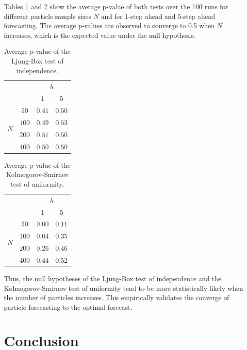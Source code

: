 \documentclass{article}
\begin{document}
Tables \ref{tab:LB} and \ref{tab:KS} show the average p-value of both tests over the 100 runs for different particle sample sizes $N$ and for 1-step ahead and 5-step ahead forecasting. The average p-values are observed to converge to 0.5 when $N$ increases, which is the expected value under the null hypothesis.

\begin{table}[ht]
\centering
\begin{tabular}{ |c|c|c|c| }
 \cline{3-4}
 \multicolumn{2}{c|}{} & \multicolumn{2}{c|}{$h$} \\
 \cline{3-4}
 \multicolumn{2}{c|}{} & $1$ & $5$ \\
 \hline
 \multirow{4}{*}{$N$} & $50$ & $0.41$ & $0.50$ \\ 
 & $100$ & $0.49$ & $0.53$ \\
 & $200$ & $0.51$ & $0.50$ \\ 
 & $400$ & $0.50$ & $0.50$ \\
 \hline
\end{tabular}
\caption{Average p-value of the Ljung-Box test of independence.}
\label{tab:LB}
\end{table}

\begin{table}[ht]
\centering
\begin{tabular}{ |c|c|c|c| }
 \cline{3-4}
 \multicolumn{2}{c|}{} & \multicolumn{2}{c|}{$h$} \\
 \cline{3-4}
 \multicolumn{2}{c|}{} & $1$ & $5$ \\
 \hline
 \multirow{4}{*}{$N$} & $50$ & $0.00$ & $0.11$ \\ 
 & $100$ & $0.04$ & $0.35$ \\
 & $200$ & $0.26$ & $0.46$ \\ 
 & $400$ & $0.44$ & $0.52$ \\
 \hline
\end{tabular}
\caption{Average p-value of the Kolmogorov-Smirnov test of uniformity.}
\label{tab:KS}
\end{table}

Thus, the null hypotheses of the Ljung-Box test of independence and the Kolmogorov-Smirnov test of uniformity tend to be more statistically likely when the number of particles increases. This empirically validates the converge of particle forecasting to the optimal forecast.

\section{Conclusion}
\end{document}
